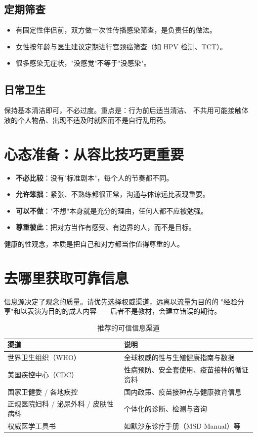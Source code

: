 \section{定期筛查}

\begin{itemize}
  \item 有固定性伴侣前，双方做一次性传播感染筛查，是负责任的做法。
  \item 女性按年龄与医生建议定期进行宫颈癌筛查（如 HPV 检测、TCT）。
  \item 很多感染无症状，"没感觉"不等于"没感染"。
\end{itemize}

\section{日常卫生}

保持基本清洁即可，不必过度。重点是：行为前后适当清洁、
不共用可能接触体液的个人物品、出现不适及时就医而不是自行乱用药。

\chapter{心态准备：从容比技巧更重要}

\begin{itemize}
  \item \textbf{不必比较}：没有"标准剧本"，每个人的节奏都不同。
  \item \textbf{允许笨拙}：紧张、不熟练都很正常，沟通与体谅远比表现重要。
  \item \textbf{可以不做}："不想"本身就是充分的理由，任何人都不应被勉强。
  \item \textbf{尊重彼此}：把对方当作有感受、有边界的人，而不是目标。
\end{itemize}

健康的性观念，本质是把自己和对方都当作值得尊重的人。

\chapter{去哪里获取可靠信息}

信息源决定了观念的质量。请优先选择权威渠道，远离以流量为目的的
"经验分享"和以表演为目的的成人内容——后者不是教材，会建立错误的期待。

\begin{table}[htbp]
  \centering
  \caption{推荐的可信信息渠道}
  \begin{tabularx}{\textwidth}{@{}l X@{}}
    \toprule
    \textbf{渠道} & \textbf{说明} \\
    \midrule
    世界卫生组织（WHO）   & 全球权威的性与生殖健康指南与数据 \\
    美国疾控中心（CDC）   & 性病预防、安全套使用、疫苗接种的循证资料 \\
    国家卫健委 / 各地疾控 & 国内政策、疫苗接种点与健康教育信息 \\
    正规医院妇科 / 泌尿外科 / 皮肤性病科 & 个体化的诊断、检测与咨询 \\
    权威医学工具书         & 如默沙东诊疗手册（MSD Manual）等 \\
    \bottomrule
  \end{tabularx}
\end{table}

